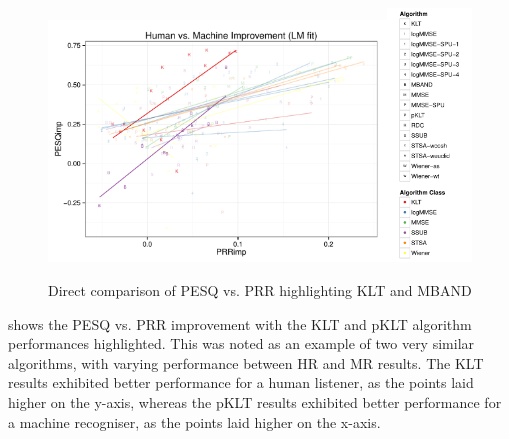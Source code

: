 \begin{figure}[h]
\noindent \begin{centering}
\includegraphics[width=0.8\textwidth]{fig/R/dir/KLT-MBAND/HumanMachineAllLM}\includegraphics[width=0.2\textwidth]{fig/R/dir/HumanMachineAllLegend}
\par\end{centering}

\protect\caption{\label{fig:direct-klt-mband}Direct comparison of \acs{PESQ} vs.
\acs{PRR} highlighting \acs{KLT} and \acs{MBAND}}
\end{figure}


 shows the \ac{PESQ} vs. \ac{PRR} improvement
with the \ac{KLT} and \ac{pKLT} algorithm performances highlighted.
This was noted as an example of two very similar algorithms, with
varying performance between \ac{HR} and \ac{MR} results. The \ac{KLT}
results exhibited better performance for a human listener, as the
points laid higher on the y-axis, whereas the \ac{pKLT} results exhibited
better performance for a machine recogniser, as the points laid higher
on the x-axis.

